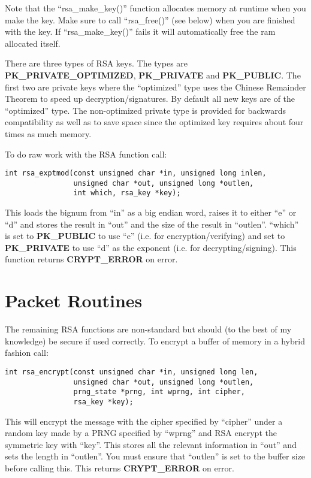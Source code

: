 \documentclass{book}
\begin{document}
Note that the ``rsa\_make\_key()'' function allocates memory at runtime when you make the key.  Make sure to call 
``rsa\_free()'' (see below) when you are finished with the key.  If ``rsa\_make\_key()'' fails it will automatically 
free the ram allocated itself.

There are three types of RSA keys.  The types are {\bf PK\_PRIVATE\_OPTIMIZED}, {\bf PK\_PRIVATE} and {\bf PK\_PUBLIC}.  The first
two are private keys where the ``optimized'' type uses the Chinese Remainder Theorem to speed up decryption/signatures.  By 
default all new keys are of the ``optimized'' type.  The non-optimized private type is provided for backwards compatibility
as well as to save space since the optimized key requires about four times as much memory.

To do raw work with the RSA function call:
\begin{verbatim}
int rsa_exptmod(const unsigned char *in, unsigned long inlen, 
                unsigned char *out, unsigned long *outlen, 
                int which, rsa_key *key);
\end{verbatim}
This loads the bignum from ``in'' as a big endian word, raises it to either ``e'' or ``d'' and stores the result
in ``out'' and the size of the result in ``outlen''. ``which'' is set to {\bf PK\_PUBLIC} to use ``e'' 
(i.e. for encryption/verifying) and set to {\bf PK\_PRIVATE} to use ``d'' as the exponent (i.e. for decrypting/signing).
This function returns {\bf CRYPT\_ERROR} on error.

\section{Packet Routines}
The remaining RSA functions are non-standard but should (to the best of my knowledge) be secure if used correctly.  To
encrypt a buffer of memory in a hybrid fashion call:
\begin{verbatim}
int rsa_encrypt(const unsigned char *in, unsigned long len, 
                unsigned char *out, unsigned long *outlen,
                prng_state *prng, int wprng, int cipher, 
                rsa_key *key);
\end{verbatim}
This will encrypt the message with the cipher specified by ``cipher'' under a random key made by a PRNG specified by
``wprng'' and RSA encrypt the symmetric key with ``key''.  This stores all the relevant information in ``out'' and sets
the length in ``outlen''.  You must ensure that ``outlen'' is set to the buffer size before calling this.  This returns
{\bf CRYPT\_ERROR} on error.  
\end{document}
